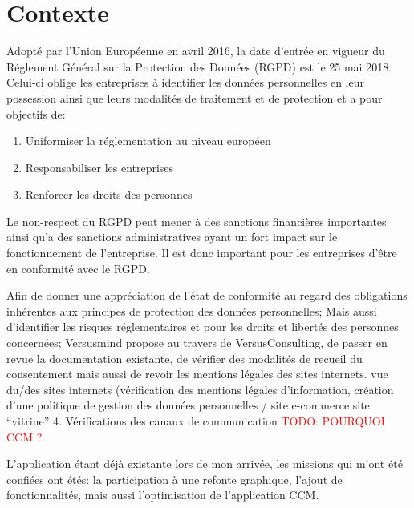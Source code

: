 \documentclass[12pt, a4paper]{report}
\makeatletter
\newcommand\tab[1][1cm]{\hspace*{#1}}
\newcommand\TODO[1]{\textcolor{red}{TODO\@: #1}}
\makeatother
\begin{document}
\section{Contexte}
\tab{} Adopté par l’Union Européenne en avril 2016, la date d’entrée en vigueur du Réglement Général sur la Protection des Données (RGPD) est le 25 mai 2018. Celui-ci oblige les entreprises à identifier les données personnelles en leur possession ainsi que leurs modalités de traitement et de protection et a pour objectifs de\@:
\begin{enumerate}
    \item Uniformiser la réglementation au niveau européen
    \item Responsabiliser les entreprises
    \item Renforcer les droits des personnes
\end{enumerate}
\tab{} Le non-respect du RGPD peut mener à des sanctions financières importantes ainsi qu'a des sanctions administratives ayant un fort impact sur le fonctionnement de l'entreprise.
Il est donc important pour les entreprises d'être en conformité avec le RGPD.\newline

Afin de donner une appréciation de l’état de conformité au regard des obligations inhérentes aux principes de protection des données personnelles; Mais aussi d'identifier les risques réglementaires et pour les droits et libertés des personnes
concernées; Versusmind propose au travers de VersusConsulting, de passer en revue la documentation existante, de vérifier des modalités de recueil du consentement mais aussi de revoir les mentions légales des sites internets. vue du/des sites internets (vérification des mentions légales d’information,
création d’une politique de gestion des données personnelles / site e-commerce
site “vitrine”
4.
Vérifications
des
canaux
de
communication
\TODO{POURQUOI CCM ?}

L'application étant déjà existante lors de mon arrivée, les missions qui m'ont été confiées ont étés: la participation à une refonte graphique, l'ajout de fonctionnalités, mais aussi l'optimisation de l'application CCM.
\end{document}
